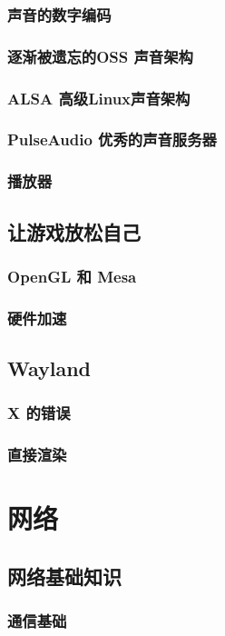 \documentclass[amstex,twoside]{ctexbook}
\begin{document}
\subsection{  声音的数字编码	}
\subsection{  逐渐被遗忘的OSS	声音架构}
\subsection{ ALSA 高级Linux声音架构}
\subsection{  PulseAudio 优秀的声音服务器	}
\subsection{  播放器	}
\section{  让游戏放松自己	}
\subsection{  OpenGL 和 Mesa	}
\subsection{  硬件加速	}
\section{  Wayland	}
\subsection{ X 的错误	}
\subsection{  直接渲染}

\chapter{网络}\label{chap:network}
\section{  网络基础知识}
\subsection{  通信基础}
\end{document}
